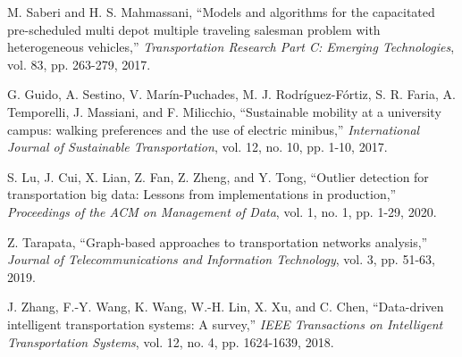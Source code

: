 \documentclass[12pt,twoside,a4paper,fleqn,bibliography=totocnumbered]{report}
\begin{document}
\begin{thebibliography}{1}
 M. Saberi and H. S. Mahmassani, ``Models and algorithms for the capacitated pre-scheduled multi depot multiple traveling salesman problem with heterogeneous vehicles,'' \emph{Transportation Research Part C: Emerging Technologies}, vol. 83, pp. 263-279, 2017.

 G. Guido, A. Sestino, V. Marín-Puchades, M. J. Rodríguez-Fórtiz, S. R. Faria, A. Temporelli, J. Massiani, and F. Milicchio, ``Sustainable mobility at a university campus: walking preferences and the use of electric minibus,'' \emph{International Journal of Sustainable Transportation}, vol. 12, no. 10, pp. 1-10, 2017.

 S. Lu, J. Cui, X. Lian, Z. Fan, Z. Zheng, and Y. Tong, ``Outlier detection for transportation big data: Lessons from implementations in production,'' \emph{Proceedings of the ACM on Management of Data}, vol. 1, no. 1, pp. 1-29, 2020.

 Z. Tarapata, ``Graph-based approaches to transportation networks analysis,'' \emph{Journal of Telecommunications and Information Technology}, vol. 3, pp. 51-63, 2019.

 J. Zhang, F.-Y. Wang, K. Wang, W.-H. Lin, X. Xu, and C. Chen, ``Data-driven intelligent transportation systems: A survey,'' \emph{IEEE Transactions on Intelligent Transportation Systems}, vol. 12, no. 4, pp. 1624-1639, 2018.

\end{thebibliography}
\end{document}
